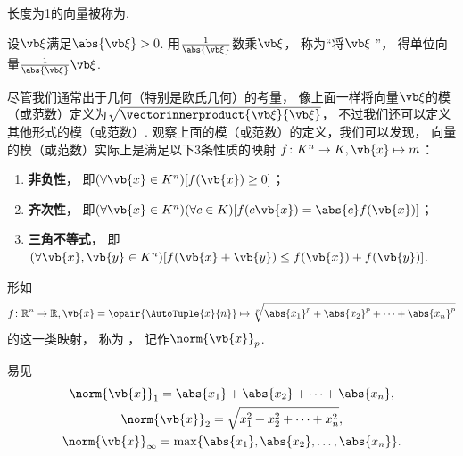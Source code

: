 \begin{definition}
长度为1的向量被称为.
\end{definition}

\begin{definition}
\def\f{\frac{1}{\abs{\a}}}
设\(\a\)满足\(\abs{\a}>0\).
用\(\f\)数乘\(\a\)，
称为“将\(\a\) ”，
得单位向量\(\f\a\).
\end{definition}

尽管我们通常出于几何（特别是欧氏几何）的考量，
像上面一样将向量\(\a\)的模（或范数）定义为\(\sqrt{\vectorinnerproduct{\a}{\a}}\)，
不过我们还可以定义其他形式的模（或范数）.
观察上面的模（或范数）的定义，我们可以发现，
向量的模（或范数）实际上是满足以下3条性质的映射
\begingroup%
\def\x{\vb{x}}%
\def\y{\vb{y}}%
\(f\colon K^n \to K, \x \mapsto m\)：
\begin{enumerate}
	\item {\rm\bf 非负性}，
	即\((\forall \x \in K^n)[f(\x) \geq 0]\)；
	\item {\rm\bf 齐次性}，
	即\((\forall \x \in K^n)(\forall c \in K)[f(c \x) = \abs{c} f(\x)]\)；
	\item {\rm\bf 三角不等式}，
	即\((\forall \x,\y \in K^n)[f(\x+\y) \leq f(\x) + f(\y)]\).
\end{enumerate}

\begin{definition}\label{definition:向量与矩阵.p范数}
形如\[
	f\colon\mathbb{R}^n \to \mathbb{R},
	\x = \opair{\AutoTuple{x}{n}}
	\mapsto
	\sqrt[p]{\abs{x_1}^p + \abs{x_2}^p + \dotsb + \abs{x_n}^p}
\]的这一类映射，
称为 ，
记作\(\norm{\x}_p\).
\end{definition}

易见
\begin{gather}
	\norm{\x}_1 = \abs{x_1} + \abs{x_2} + \dotsb + \abs{x_n}, \\
	\norm{\x}_2 = \sqrt{x_1^2 + x_2^2 + \dotsb + x_n^2}, \\
	\norm{\x}_\infty = \max\{\abs{x_1},\abs{x_2},\dotsc,\abs{x_n}\}.
\end{gather}
\endgroup%
